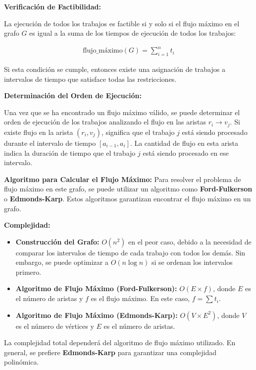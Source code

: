\documentclass[14pt]{extarticle}
\begin{document}
\textbf{Verificación de Factibilidad:}

La ejecución de todos los trabajos es factible si y solo si el flujo máximo en el grafo $G$ es igual a la suma de los tiempos de ejecución de todos los trabajos:

\begin{align*}
\text{flujo\_máximo}(G) = \sum_{i=1}^{n} t_i
\end{align*}

Si esta condición se cumple, entonces existe una asignación de trabajos a intervalos de tiempo que satisface todas las restricciones.

\textbf{Determinación del Orden de Ejecución:}

Una vez que se ha encontrado un flujo máximo válido, se puede determinar el orden de ejecución de los trabajos analizando el flujo en las aristas $r_i \rightarrow v_j$. Si existe flujo en la arista $(r_i, v_j)$, significa que el trabajo $j$ está siendo procesado durante el intervalo de tiempo $[a_{i-1}, a_i]$. La cantidad de flujo en esta arista indica la duración de tiempo que el trabajo $j$ está siendo procesado en ese intervalo.

\textbf{Algoritmo para Calcular el Flujo Máximo:} Para resolver el problema de flujo máximo en este grafo, se puede utilizar un algoritmo como \textbf{Ford-Fulkerson} o \textbf{Edmonds-Karp}. Estos algoritmos garantizan encontrar el flujo máximo en un grafo.

\textbf{Complejidad:}

\begin{itemize}
    \item \textbf{Construcción del Grafo:} $O(n^2)$ en el peor caso, debido a la necesidad de comparar los intervalos de tiempo de cada trabajo con todos los demás. Sin embargo, se puede optimizar a $O(n \log n)$ si se ordenan los intervalos primero.
    \item \textbf{Algoritmo de Flujo Máximo (Ford-Fulkerson):} $O(E \times f)$, donde $E$ es el número de aristas y $f$ es el flujo máximo. En este caso, $f = \sum t_i$.
    \item \textbf{Algoritmo de Flujo Máximo (Edmonds-Karp):} $O(V \times E^2)$, donde $V$ es el número de vértices y $E$ es el número de aristas.
\end{itemize}

La complejidad total dependerá del algoritmo de flujo máximo utilizado. En general, se prefiere \textbf{Edmonds-Karp} para garantizar una complejidad polinómica.
\end{document}
